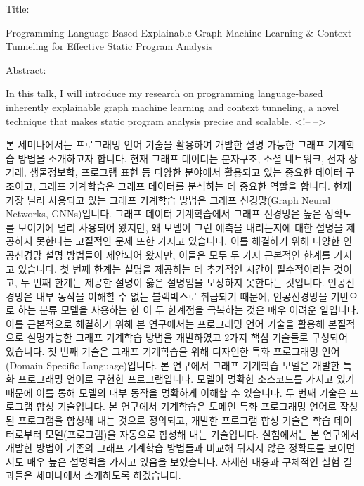 


Title:

Programming Language-Based Explainable Graph Machine Learning & 
Context Tunneling for Effective Static Program Analysis


Abstract:

In this talk, I will introduce my research on programming language-based inherently explainable graph machine learning and context tunneling, a novel technique that makes static program analysis precise and scalable.
<!--  -->






본 세미나에서는 프로그래밍 언어 기술을 활용하여 개발한 설명 가능한 그래프 기계학습 방법을 소개하고자 합니다. 현재 그래프 데이터는 분자구조, 소셜 네트워크, 전자 상거래, 생물정보학, 프로그램 표현 등 다양한 분야에서 활용되고 있는 중요한 데이터 구조이고, 그래프 기계학습은 그래프 데이터를 분석하는 데 중요한 역할을 합니다. 현재 가장 널리 사용되고 있는 그래프 기계학습 방법은 그래프 신경망(Graph Neural Networks, GNNs)입니다. 그래프 데이터 기계학습에서 그래프 신경망은 높은 정확도를 보이기에 널리 사용되어 왔지만, 왜 모델이 그런 예측을 내리는지에 대한 설명을 제공하지 못한다는 고질적인 문제 또한 가지고 있습니다. 이를 해결하기 위해 다양한 인공신경망 설명 방법들이 제안되어 왔지만, 이들은 모두 두 가지 근본적인 한계를 가지고 있습니다. 첫 번째 한계는 설명을 제공하는 데 추가적인 시간이 필수적이라는 것이고, 두 번째 한계는 제공한 설명이 옳은 설명임을 보장하지 못한다는 것입니다. 인공신경망은 내부 동작을 이해할 수 없는 블랙박스로 취급되기 때문에, 인공신경망을 기반으로 하는 분류 모델을 사용하는 한 이 두 한계점을 극복하는 것은 매우 어려운 일입니다. 이를 근본적으로 해결하기 위해 본 연구에서는 프로그래밍 언어 기술을 활용해 본질적으로 설명가능한 그래프 기계학습 방법을 개발하였고 2가지 핵심 기술들로 구성되어 있습니다. 첫 번째 기술은 그래프 기계학습을 위해 디자인한 특화 프로그래밍 언어(Domain Specific Language)입니다. 본 연구에서 그래프 기계학습 모델은 개발한 특화 프로그래밍 언어로 구현한 프로그램입니다. 모델이 명확한 소스코드를 가지고 있기 때문에 이를 통해 모델의 내부 동작을 명확하게 이해할 수 있습니다. 두 번째 기술은 프로그램 합성 기술입니다. 본 연구에서 기계학습은 도메인 특화 프로그래밍 언어로 작성된 프로그램을 합성해 내는 것으로 정의되고, 개발한 프로그램 합성 기술은 학습 데이터로부터 모델(프로그램)을 자동으로 합성해 내는 기술입니다. 실험에서는 본 연구에서 개발한 방법이 기존의 그래프 기계학습 방법들과 비교해 뒤지지 않은 정확도를 보이면서도 매우 높은 설명력을 가지고 있음을 보였습니다. 자세한 내용과 구체적인 실험 결과들은 세미나에서 소개하도록 하겠습니다.